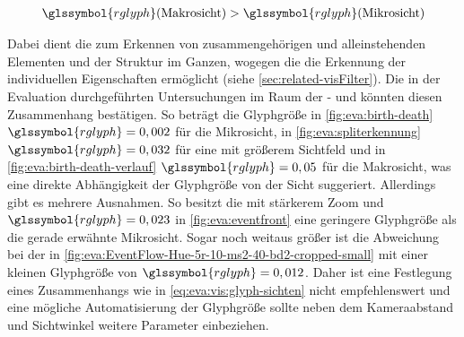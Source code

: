 \begin{equation}
\begin{aligned}\label{eq:eva:vis:glyph-sichten}
\glssymbol{rglyph} (\text{Makrosicht}) > \glssymbol{rglyph}(\text{Mikrosicht})
\end{aligned}
\end{equation}

Dabei dient die  zum Erkennen von zusammengehörigen und alleinstehenden Elementen und der Struktur im Ganzen, wogegen die  die Erkennung der individuellen Eigenschaften ermöglicht (siehe \autoref{sec:related-visFilter}). Die in der Evaluation durchgeführten Untersuchungen im Raum der - und  könnten diesen Zusammenhang bestätigen. So beträgt die Glyphgröße in \autoref{fig:eva:birth-death} $\glssymbol{rglyph} = 0,002$ für die Mikrosicht, in \autoref{fig:eva:spliterkennung} $\glssymbol{rglyph} = 0,032$ für eine  mit größerem Sichtfeld und in \autoref{fig:eva:birth-death-verlauf} $\glssymbol{rglyph} = 0,05$ für die Makrosicht, was eine direkte Abhängigkeit der Glyphgröße  von der Sicht suggeriert. Allerdings gibt es mehrere Ausnahmen. So besitzt die  mit stärkerem Zoom und $\glssymbol{rglyph} = 0,023$ in \autoref{fig:eva:eventfront} eine geringere Glyphgröße als die gerade erwähnte Mikrosicht. Sogar noch weitaus größer ist die Abweichung bei der  in \autoref{fig:eva:EventFlow-Hue-5r-10-ms2-40-bd2-cropped-small} mit einer kleinen Glyphgröße von $\glssymbol{rglyph} = 0,012$. Daher ist eine Festlegung eines Zusammenhangs wie in \autoref{eq:eva:vis:glyph-sichten} nicht empfehlenswert und eine mögliche Automatisierung der Glyphgröße sollte neben dem Kameraabstand und Sichtwinkel weitere Parameter einbeziehen.




